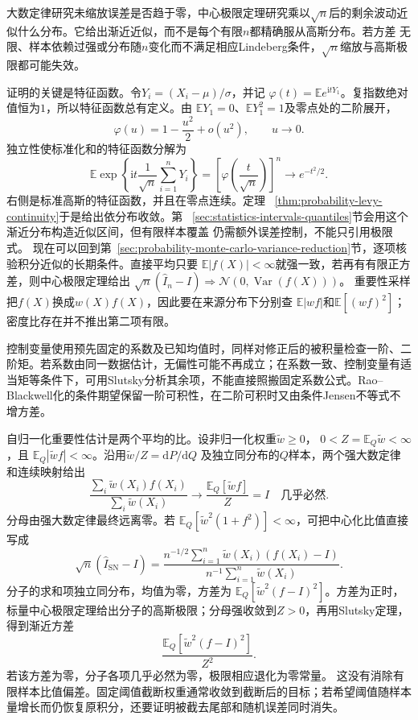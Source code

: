 大数定律研究未缩放误差是否趋于零，中心极限定理研究乘以\(\sqrt{n}\)后的剩余波动近似什么分布。它给出渐近近似，而不是每个有限\(n\)都精确服从高斯分布。若方差
无限、样本依赖过强或分布随\(n\)变化而不满足相应Lindeberg条件，\(\sqrt{n}\)缩放与高斯极限都可能失效。

证明的关键是特征函数。令\(Y_i=(X_i-\mu)/\sigma\)，并记
\(\varphi(t)=\mathbb{E}e^{\mathrm{i}tY_1}\)。复指数绝对值恒为\(1\)，所以特征函数总有定义。由
\(\mathbb{E}Y_1=0\)、\(\mathbb{E}Y_1^2=1\)及零点处的二阶展开，
\[
  \varphi(u)=1-\frac{u^2}{2}+o(u^2),
  \qquad u\to0.
\]
独立性使标准化和的特征函数分解为
\[
  \mathbb{E}\exp\left\{
    \mathrm{i}t\frac{1}{\sqrt n}\sum_{i=1}^{n}Y_i
  \right\}
  =
  \left[\varphi\left(\frac{t}{\sqrt n}\right)\right]^n
  \longrightarrow e^{-t^2/2}.
\]
右侧是标准高斯的特征函数，并且在零点连续。定理
~\ref{thm:probability-levy-continuity}于是给出依分布收敛。第
~\ref{sec:statistics-intervals-quantiles}节会用这个渐近分布构造近似区间，但有限样本覆盖
仍需额外误差控制，不能只引用极限式。
现在可以回到第~\ref{sec:probability-monte-carlo-variance-reduction}节，逐项核验积分近似的长期条件。直接平均只要
\(\mathbb E|f(X)|<\infty\)就强一致，若再有有限正方差，则中心极限定理给出
\(\sqrt n(\widehat I_n-I)\Rightarrow\mathcal N(0,\operatorname{Var}(f(X)))\)。
重要性采样把\(f(X)\)换成\(w(X)f(X)\)，因此要在来源分布下分别查
\(\mathbb E|wf|\)和\(\mathbb E[(wf)^2]\)；密度比存在并不推出第二项有限。

控制变量使用预先固定的系数及已知均值时，同样对修正后的被积量检查一阶、二阶矩。若系数由同一数据估计，无偏性可能不再成立；在系数一致、控制变量有适当矩等条件下，可用Slutsky分析其余项，不能直接照搬固定系数公式。Rao--Blackwell化的条件期望保留一阶可积性，在二阶可积时又由条件Jensen不等式不增方差。

自归一化重要性估计是两个平均的比。设非归一化权重\(\widetilde w\geq0\)，
\(0<Z=\mathbb E_Q\widetilde w<\infty\)，且
\(\mathbb E_Q|\widetilde wf|<\infty\)。沿用\(\widetilde w/Z=\mathrm dP/\mathrm dQ\)
及独立同分布的\(Q\)样本，两个强大数定律和连续映射给出
\[
\frac{\sum_i\widetilde w(X_i)f(X_i)}
{\sum_i\widetilde w(X_i)}
\longrightarrow
\frac{\mathbb E_Q[\widetilde wf]}Z=I
\quad\text{几乎必然}.
\]
分母由强大数定律最终远离零。若
\(\mathbb E_Q[\widetilde w^2(1+f^2)]<\infty\)，可把中心化比值直接写成
\[
 \sqrt n(\widehat I_{\mathrm{SN}}-I)
 =\frac{n^{-1/2}\sum_{i=1}^n
       \widetilde w(X_i)(f(X_i)-I)}
       {n^{-1}\sum_{i=1}^n\widetilde w(X_i)}.
\]
分子的求和项独立同分布，均值为零，方差为
\(\mathbb E_Q[\widetilde w^2(f-I)^2]\)。方差为正时，标量中心极限定理给出分子的高斯极限；分母强收敛到\(Z>0\)，再用Slutsky定理，得到渐近方差
\[
\frac{\mathbb E_Q[\widetilde w^2(f-I)^2]}{Z^2}.
\]
若该方差为零，分子各项几乎必然为零，极限相应退化为零常量。
这没有消除有限样本比值偏差。固定阈值截断权重通常收敛到截断后的目标；若希望阈值随样本量增长而仍恢复原积分，还要证明被截去尾部和随机误差同时消失。

